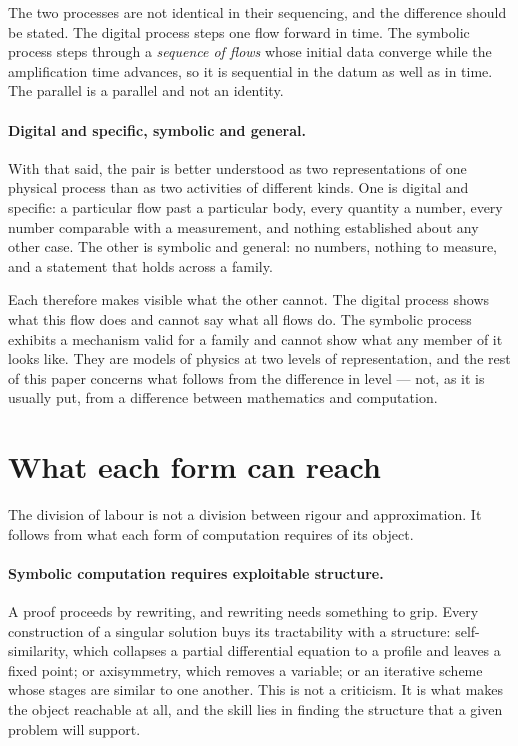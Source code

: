 \documentclass[11pt]{article}
\begin{document}
The two processes are not identical in their sequencing, and the difference should be stated.
The digital process steps one flow forward in time. The symbolic process steps through a
\emph{sequence of flows} whose initial data converge while the amplification time advances, so it is
sequential in the datum as well as in time. The parallel is a parallel and not an identity.

\paragraph{Digital and specific, symbolic and general.} With that said, the pair is better understood
as two representations of one physical process than as two activities of different kinds. One is
digital and specific: a particular flow past a particular body, every quantity a number, every number
comparable with a measurement, and nothing established about any other case. The other is symbolic
and general: no numbers, nothing to measure, and a statement that holds across a family.

Each therefore makes visible what the other cannot. The digital process shows what this flow does and
cannot say what all flows do. The symbolic process exhibits a mechanism valid for a family and cannot
show what any member of it looks like. They are models of physics at two levels of representation,
and the rest of this paper concerns what follows from the difference in level --- not, as it is
usually put, from a difference between mathematics and computation.

\section{What each form can reach}\label{sec:reach}

The division of labour is not a division between rigour and approximation. It follows from what each
form of computation requires of its object.

\paragraph{Symbolic computation requires exploitable structure.} A proof proceeds by rewriting, and
rewriting needs something to grip. Every construction of a singular solution buys its tractability
with a structure: self-similarity, which collapses a partial differential equation to a profile and
leaves a fixed point; or axisymmetry, which removes a variable; or an iterative scheme whose stages
are similar to one another. This is not a criticism. It is what makes the object reachable at all,
and the skill lies in finding the structure that a given problem will support.
\end{document}
